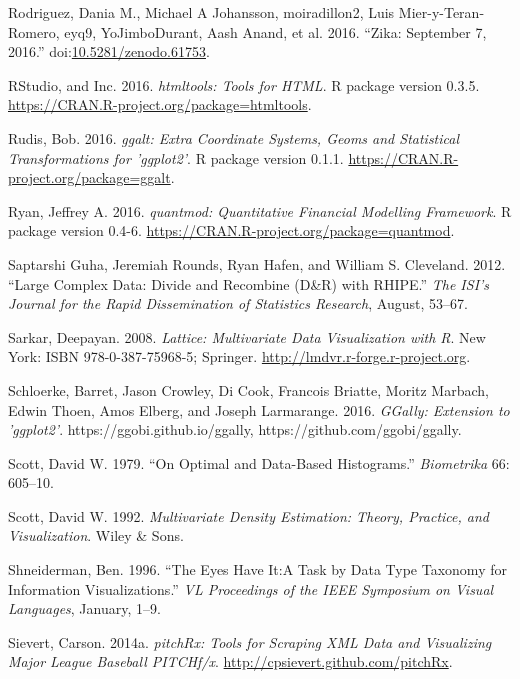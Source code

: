 \documentclass[12pt,]{isuthesis}
\begin{document}
\hypertarget{ref-zika-data}{}
Rodriguez, Dania M., Michael A Johansson, moiradillon2, Luis
Mier-y-Teran-Romero, eyq9, YoJimboDurant, Aash Anand, et al. 2016.
``Zika: September 7, 2016.''
doi:\href{https://doi.org/10.5281/zenodo.61753}{10.5281/zenodo.61753}.

\hypertarget{ref-htmltools}{}
RStudio, and Inc. 2016. \emph{htmltools: Tools for HTML}. R package
version 0.3.5. \url{https://CRAN.R-project.org/package=htmltools}.

\hypertarget{ref-ggalt}{}
Rudis, Bob. 2016. \emph{ggalt: Extra Coordinate Systems, Geoms and
Statistical Transformations for 'ggplot2'}. R package version 0.1.1.
\url{https://CRAN.R-project.org/package=ggalt}.

\hypertarget{ref-quantmod}{}
Ryan, Jeffrey A. 2016. \emph{quantmod: Quantitative Financial Modelling
Framework}. R package version 0.4-6.
\url{https://CRAN.R-project.org/package=quantmod}.

\hypertarget{ref-RHIPE}{}
Saptarshi Guha, Jeremiah Rounds, Ryan Hafen, and William S. Cleveland.
2012. ``Large Complex Data: Divide and Recombine (D\&R) with RHIPE.''
\emph{The ISI's Journal for the Rapid Dissemination of Statistics
Research}, August, 53--67.

\hypertarget{ref-lattice}{}
Sarkar, Deepayan. 2008. \emph{Lattice: Multivariate Data Visualization
with R}. New York: ISBN 978-0-387-75968-5; Springer.
\url{http://lmdvr.r-forge.r-project.org}.

\hypertarget{ref-GGally}{}
Schloerke, Barret, Jason Crowley, Di Cook, Francois Briatte, Moritz
Marbach, Edwin Thoen, Amos Elberg, and Joseph Larmarange. 2016.
\emph{GGally: Extension to 'ggplot2'}. https://ggobi.github.io/ggally,
https://github.com/ggobi/ggally.

\hypertarget{ref-hist-scott}{}
Scott, David W. 1979. ``On Optimal and Data-Based Histograms.''
\emph{Biometrika} 66: 605--10.

\hypertarget{ref-mde}{}
Scott, David W. 1992. \emph{Multivariate Density Estimation: Theory,
Practice, and Visualization}. Wiley \& Sons.

\hypertarget{ref-details-on-demand}{}
Shneiderman, Ben. 1996. ``The Eyes Have It:A Task by Data Type Taxonomy
for Information Visualizations.'' \emph{VL Proceedings of the IEEE
Symposium on Visual Languages}, January, 1--9.

\hypertarget{ref-pitchRx}{}
Sievert, Carson. 2014a. \emph{pitchRx: Tools for Scraping XML Data and
Visualizing Major League Baseball PITCHf/x}.
\url{http://cpsievert.github.com/pitchRx}.
\end{document}

